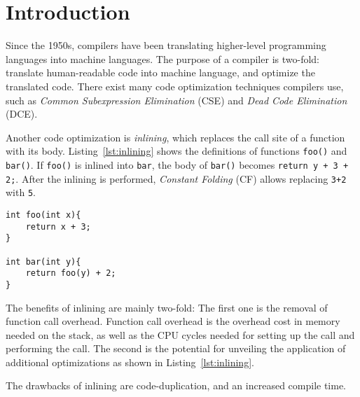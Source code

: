 
\section{Introduction}
\label{introduction}

Since the 1950s, compilers have been translating higher-level programming
languages into machine languages. The purpose of a compiler is two-fold:
translate human-readable code into machine language, and optimize the translated
code. There exist many code optimization techniques compilers use, such as
\textit{Common Subexpression Elimination}
(CSE) and \textit{Dead Code Elimination} (DCE).

Another code optimization is \textit{inlining}, which replaces the call site of
a function with its body. Listing~\ref{lst:inlining} shows the definitions of
functions \lstinline!foo()! and \lstinline!bar()!. If \lstinline!foo()! is
inlined into \lstinline!bar!, the body of \lstinline!bar()! becomes
\lstinline!return y + 3 + 2;!. After the inlining is performed, \textit{Constant
Folding} (CF) allows replacing \lstinline!3+2! with \lstinline!5!.

\begin{centering}
	\noindent\begin{minipage}{\textwidth}
		\begin{CenteredBox}
		\begin{lstlisting}[style=global_customcpp]
int foo(int x){
	return x + 3;
}

int bar(int y){
	return foo(y) + 2;
}
		\end{lstlisting}
		\end{CenteredBox}
	\end{minipage}
	\label{lst:inlining}
\end{centering}

The benefits of inlining are mainly two-fold: The first one is the removal of
function call overhead. Function call overhead is the overhead cost in memory
needed on the stack, as well as the CPU cycles needed for setting up the call
and performing the call. The second is the potential for unveiling the
application of additional optimizations as shown in Listing~\ref{lst:inlining}.

The drawbacks of inlining are code-duplication, and an increased compile time.

